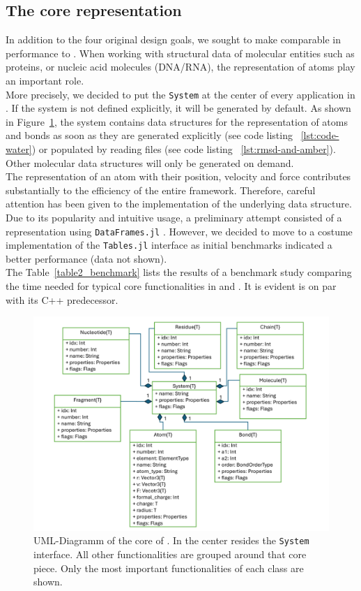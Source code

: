 \subsection{The core representation}
In addition to the four original design goals, we sought to make \biochem comparable in performance to \ball. When working with structural data of molecular entities such as proteins, or nucleic acid molecules (DNA/RNA), the representation of atoms play an important role. \\
More precisely, we decided to put the \texttt{System} at the center of every application in \biochem. If the system is not defined explicitly, it will be generated by default. As shown in Figure~\ref{fig:biochem_uml}, the system contains data structures for the representation of atoms and bonds as soon as they are generated explicitly (see code listing ~\ref{lst:code-water})  or populated by reading files (see code listing ~\ref{lst:rmsd-and-amber}).  Other molecular data structures will only be generated on demand. \\
The representation of an atom with their position, velocity and force contributes substantially to the efficiency of the entire framework. Therefore, careful attention has been given to the implementation of the underlying data structure. Due to its popularity and intuitive usage, a preliminary attempt consisted of a representation using \texttt{DataFrames.jl} \cite{Bouchet-Valat2023}. However, we decided to move to a costume implementation of the \texttt{Tables.jl} interface \cite{BouchetValat2018} as initial benchmarks indicated a better performance (data not shown). \\
The Table~\ref{table2_benchmark} lists the results of a benchmark study comparing the time needed for typical core functionalities in \ball and \biochem. It is evident \biochem is on par with its C++ predecessor.
\begin{figure}[t]
	\centerline{\includegraphics[width=15cm]{gfx/uml.png}}
	\caption{UML-Diagramm of the core of \biochem . In the center resides the \texttt{System} interface. All other functionalities are grouped around that core piece. Only the most important functionalities of each class are  shown.}
	\label{fig:biochem_uml}
\end{figure}


